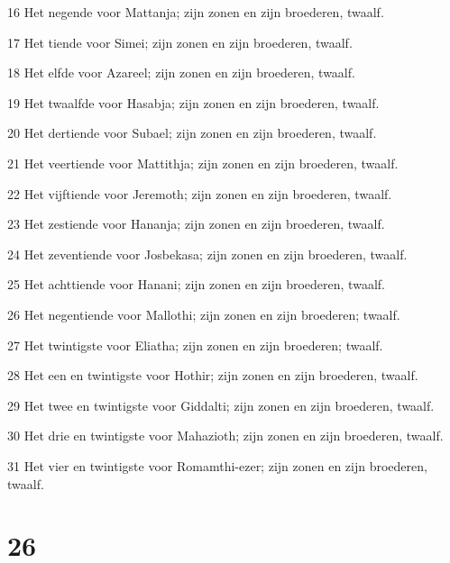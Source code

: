 \par 16 Het negende voor Mattanja; zijn zonen en zijn broederen, twaalf.
\par 17 Het tiende voor Simei; zijn zonen en zijn broederen, twaalf.
\par 18 Het elfde voor Azareel; zijn zonen en zijn broederen, twaalf.
\par 19 Het twaalfde voor Hasabja; zijn zonen en zijn broederen, twaalf.
\par 20 Het dertiende voor Subael; zijn zonen en zijn broederen, twaalf.
\par 21 Het veertiende voor Mattithja; zijn zonen en zijn broederen, twaalf.
\par 22 Het vijftiende voor Jeremoth; zijn zonen en zijn broederen, twaalf.
\par 23 Het zestiende voor Hananja; zijn zonen en zijn broederen, twaalf.
\par 24 Het zeventiende voor Josbekasa; zijn zonen en zijn broederen, twaalf.
\par 25 Het achttiende voor Hanani; zijn zonen en zijn broederen, twaalf.
\par 26 Het negentiende voor Mallothi; zijn zonen en zijn broederen; twaalf.
\par 27 Het twintigste voor Eliatha; zijn zonen en zijn broederen; twaalf.
\par 28 Het een en twintigste voor Hothir; zijn zonen en zijn broederen, twaalf.
\par 29 Het twee en twintigste voor Giddalti; zijn zonen en zijn broederen, twaalf.
\par 30 Het drie en twintigste voor Mahazioth; zijn zonen en zijn broederen, twaalf.
\par 31 Het vier en twintigste voor Romamthi-ezer; zijn zonen en zijn broederen, twaalf.

\chapter{26}

